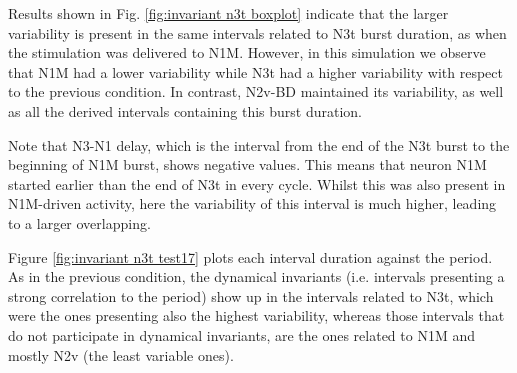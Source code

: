 Results shown in Fig. \ref{fig:invariant n3t boxplot} indicate that the larger variability is present in the same intervals related to N3t burst duration, as when the stimulation was delivered to N1M. However, in this simulation we observe that N1M had a lower variability while N3t had a higher variability with respect to the previous condition. 
In contrast, N2v-BD maintained its variability, as well as all the derived intervals containing this burst duration.

Note that N3-N1 delay, which is the interval from the end of the N3t burst to the beginning of N1M burst, shows negative values. This means that neuron N1M started earlier than the end of N3t in every cycle. Whilst this was also present in N1M-driven activity, here the variability of this interval is much higher, leading to a larger overlapping.

Figure \ref{fig:invariant n3t test17} plots each interval duration against the period. As in the previous condition, the dynamical invariants (i.e. intervals presenting a strong correlation to the period) show up in the intervals related to N3t, which were the ones presenting also the highest variability, whereas those intervals that do not participate in dynamical invariants, are the ones related to N1M and mostly N2v (the least variable ones). 


%

